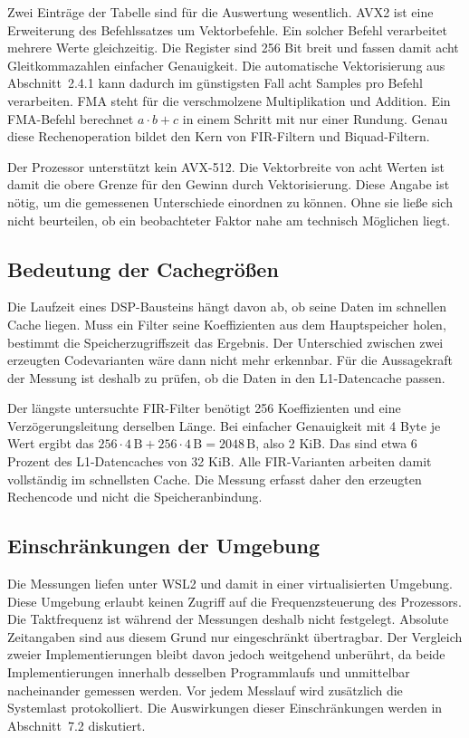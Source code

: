 Zwei Einträge der Tabelle sind für die Auswertung wesentlich. AVX2 ist eine
Erweiterung des Befehlssatzes um Vektorbefehle. Ein solcher Befehl verarbeitet
mehrere Werte gleichzeitig. Die Register sind 256 Bit breit und fassen damit
acht Gleitkommazahlen einfacher Genauigkeit. Die automatische Vektorisierung
aus Abschnitt~2.4.1 kann dadurch im günstigsten Fall acht Samples pro Befehl
verarbeiten. FMA steht für die verschmolzene Multiplikation und Addition. Ein
FMA-Befehl berechnet $a \cdot b + c$ in einem Schritt mit nur einer Rundung.
Genau diese Rechenoperation bildet den Kern von FIR-Filtern und
Biquad-Filtern.

Der Prozessor unterstützt kein AVX-512. Die Vektorbreite von acht Werten ist
damit die obere Grenze für den Gewinn durch Vektorisierung. Diese Angabe ist
nötig, um die gemessenen Unterschiede einordnen zu können. Ohne sie ließe
sich nicht beurteilen, ob ein beobachteter Faktor nahe am technisch Möglichen
liegt.

\subsection{Bedeutung der Cachegrößen}

Die Laufzeit eines DSP-Bausteins hängt davon ab, ob seine Daten im schnellen
Cache liegen. Muss ein Filter seine Koeffizienten aus dem Hauptspeicher
holen, bestimmt die Speicherzugriffszeit das Ergebnis. Der Unterschied
zwischen zwei erzeugten Codevarianten wäre dann nicht mehr erkennbar. Für die
Aussagekraft der Messung ist deshalb zu prüfen, ob die Daten in den
L1-Datencache passen.

Der längste untersuchte FIR-Filter benötigt 256 Koeffizienten und eine
Verzögerungsleitung derselben Länge. Bei einfacher Genauigkeit mit 4 Byte je
Wert ergibt das
$256 \cdot 4\,\mathrm{B} + 256 \cdot 4\,\mathrm{B} = 2048\,\mathrm{B}$, also
2 KiB. Das sind etwa 6 Prozent des L1-Datencaches von 32 KiB. Alle
FIR-Varianten arbeiten damit vollständig im schnellsten Cache. Die Messung
erfasst daher den erzeugten Rechencode und nicht die Speicheranbindung.

\subsection{Einschränkungen der Umgebung}

Die Messungen liefen unter WSL2 und damit in einer virtualisierten Umgebung.
Diese Umgebung erlaubt keinen Zugriff auf die Frequenzsteuerung des
Prozessors. Die Taktfrequenz ist während der Messungen deshalb nicht
festgelegt. Absolute Zeitangaben sind aus diesem Grund nur eingeschränkt
übertragbar. Der Vergleich zweier Implementierungen bleibt davon jedoch
weitgehend unberührt, da beide Implementierungen innerhalb desselben
Programmlaufs und unmittelbar nacheinander gemessen werden. Vor jedem
Messlauf wird zusätzlich die Systemlast protokolliert. Die Auswirkungen
dieser Einschränkungen werden in Abschnitt~7.2 diskutiert.


